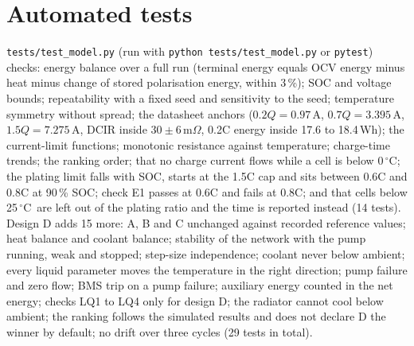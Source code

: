 \documentclass[11pt,a4paper]{article}
\newcommand{\degC}{\ensuremath{{}^{\circ}\mathrm{C}}}
\begin{document}
\section{Automated tests}\label{sec:tests}
\texttt{tests/test\_model.py} (run with \texttt{python tests/test\_model.py} or \texttt{pytest}) checks: energy balance over a full run (terminal energy equals OCV energy minus heat minus change of stored polarisation energy, within 3\,\%); SOC and voltage bounds; repeatability with a fixed seed and sensitivity to the seed; temperature symmetry without spread; the datasheet anchors ($0.2Q=0.97$\,A, $0.7Q=3.395$\,A, $1.5Q=7.275$\,A, DCIR inside $30\pm6$\,m$\Omega$, 0.2C energy inside 17.6 to 18.4\,Wh); the current-limit functions; monotonic resistance against temperature; charge-time trends; the ranking order; that no charge current flows while a cell is below 0\,\degC; the plating limit falls with SOC, starts at the 1.5C cap and sits between 0.6C and 0.8C at 90\,\% SOC; check E1 passes at 0.6C and fails at 0.8C; and that cells below 25\,\degC\ are left out of the plating ratio and the time is reported instead (14 tests). Design D adds 15 more: A, B and C unchanged against recorded reference values; heat balance and coolant balance; stability of the network with the pump running, weak and stopped; step-size independence; coolant never below ambient; every liquid parameter moves the temperature in the right direction; pump failure and zero flow; BMS trip on a pump failure; auxiliary energy counted in the net energy; checks LQ1 to LQ4 only for design D; the radiator cannot cool below ambient; the ranking follows the simulated results and does not declare D the winner by default; no drift over three cycles (29 tests in total).

\end{document}
